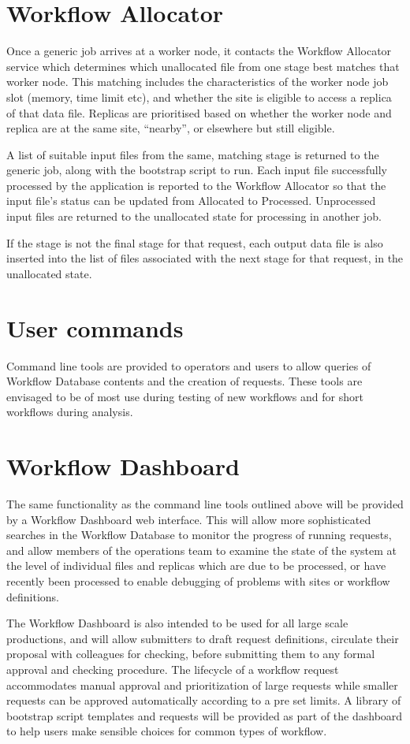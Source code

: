 \documentclass[../main-v1.tex]{subfiles}
\begin{document}
\section{Workflow Allocator}
\label{sec:flow:allocator}

Once a generic job arrives at a worker node, it contacts the Workflow Allocator service which determines which unallocated file from one stage best matches that worker node. This matching includes the characteristics of the worker node job slot (memory, time limit etc), and whether the site is eligible to access a replica of that data file. Replicas are prioritised based on whether the worker node and replica are at the same site, ``nearby'', or elsewhere but still eligible. 

A list of suitable input files from the same, matching stage is returned to the generic job, along with the bootstrap script to run. Each input file successfully processed by the application is reported to the Workflow Allocator so that the input file’s status can be updated from Allocated to Processed. Unprocessed input files are returned to the unallocated state for processing in another job. 

If the stage is not the final stage for that request, each output data file is also inserted into the list of files associated with the next stage for that request, in the unallocated state. 

\section{User commands}
\label{sec:flow:commands}

Command line tools are provided to operators and users to allow queries of Workflow Database contents and the creation of requests. These tools are envisaged to be of most use during testing of new workflows and for short workflows during analysis. 

\section{Workflow Dashboard}
\label{sec:flow:dashboard}

The same functionality as the command line tools outlined above will be provided by a Workflow Dashboard web interface. This will allow more sophisticated searches in the Workflow Database to monitor the progress of running requests, and allow members of the operations team to examine the state of the system at the level of individual files and replicas which are due to be processed, or have recently been processed to enable debugging of problems with sites or workflow definitions.

The Workflow Dashboard is also intended to be used for all large scale productions, and will allow submitters to draft request definitions, circulate their proposal with colleagues for checking, before submitting them to any formal approval and checking procedure. The lifecycle of a workflow request accommodates manual approval and prioritization of large requests while smaller requests can be approved automatically according to a pre set limits. A library of bootstrap script templates and requests will be provided as part of the dashboard to help users make sensible choices for common types of workflow.
\end{document}
